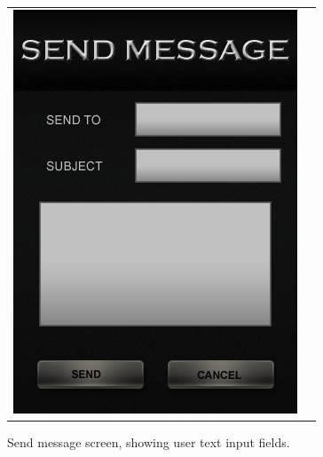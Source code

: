 \begin{figure}[h!]
\centering
\begin{tabular}{cc}
	\begin{minipage}{0.3\textwidth}
		\begin{center}
		\begin{minipage}{0.83\textwidth}
		\includegraphics[width=\textwidth]{images/send_message_mockup}
		\caption{Send message screen, showing user text input fields.}
		\label{send_message}
		\end{minipage}
		\end{center}
	\end{minipage}
	\begin{minipage}{0.3\textwidth}
		\begin{center}
		\begin{minipage}{0.79\textwidth}

\end{minipage}
\end{center}
\end{minipage}
\end{tabular}
\end{figure}
